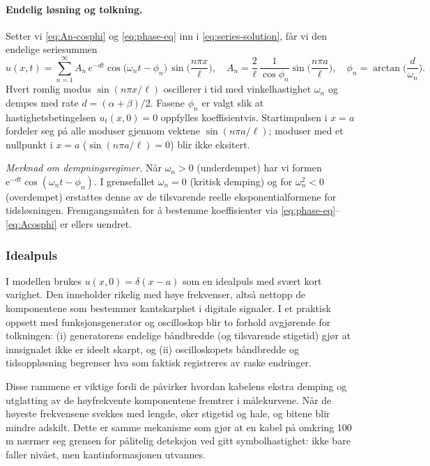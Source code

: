 \paragraph{Endelig løsning og tolkning.}
Setter vi \eqref{eq:An-cosphi} og \eqref{eq:phase-eq} inn i \eqref{eq:series-solution}, får vi den endelige seriesummen
\begin{equation}\label{eq:final-solution}
u(x,t)=\sum_{n=1}^{\infty} A_n\,e^{-dt}\cos\!\big(\omega_n t-\phi_n\big)\,
\sin\!\Big(\frac{n\pi x}{\ell}\Big),
\quad
A_n=\frac{2}{\ell}\,\frac{1}{\cos\phi_n}\sin\!\Big(\frac{n\pi a}{\ell}\Big),
\quad
\phi_n=\arctan\!\Big(\frac{d}{\omega_n}\Big).
\end{equation}
Hvert romlig modus \(\sin(n\pi x/\ell)\) oscillerer i tid med vinkelhastighet \(\omega_n\) og dempes med rate \(d=(\alpha+\beta)/2\). Fasene \(\phi_n\) er valgt slik at hastighetsbetingelsen \(u_t(x,0)=0\) oppfylles koeffisientvis. Startimpulsen i \(x=a\) fordeler seg på alle moduser gjennom vektene \(\sin(n\pi a/\ell)\); moduser med et nullpunkt i \(x=a\) (\(\sin(n\pi a/\ell)=0\)) blir ikke eksitert.

\medskip
\noindent
\emph{Merknad om dempningsregimer.} Når \(\omega_n>0\) (underdempet) har vi formen \(\mathrm{e}^{-dt}\cos(\omega_n t-\phi_n)\). I grensefallet \(\omega_n=0\) (kritisk demping) og for \(\omega_n^2<0\) (overdempet) erstattes denne av de tilsvarende reelle eksponentialformene for tidsløsningen. Fremgangsmåten for å bestemme koeffisienter via \eqref{eq:phase-eq}–\eqref{eq:Acosphi} er ellers uendret.

\subsubsection{Idealpuls}


I modellen brukes \(u(x,0)=\delta(x-a)\) som en idealpuls med svært kort varighet. Den inneholder rikelig med høye frekvenser, altså nettopp de komponentene som bestemmer kantskarphet i digitale signaler. I et praktisk oppsett med funksjonsgenerator og oscilloskop blir to forhold avgjørende for tolkningen: (i) generatorens endelige båndbredde (og tilsvarende stigetid) gjør at innsignalet ikke er ideelt skarpt, og (ii) oscilloskopets båndbredde og tidsoppløsning begrenser hva som faktisk registreres av raske endringer. 

Disse rammene er viktige fordi de påvirker hvordan kabelens ekstra demping og utglatting av de høyfrekvente komponentene fremtrer i målekurvene. Når de høyeste frekvensene svekkes med lengde, øker stigetid og hale, og bitene blir mindre adskilt. Dette er samme mekanisme som gjør at en kabel på omkring 100\,m nærmer seg grensen for pålitelig deteksjon ved gitt symbolhastighet: ikke bare faller nivået, men kantinformasjonen utvannes.





